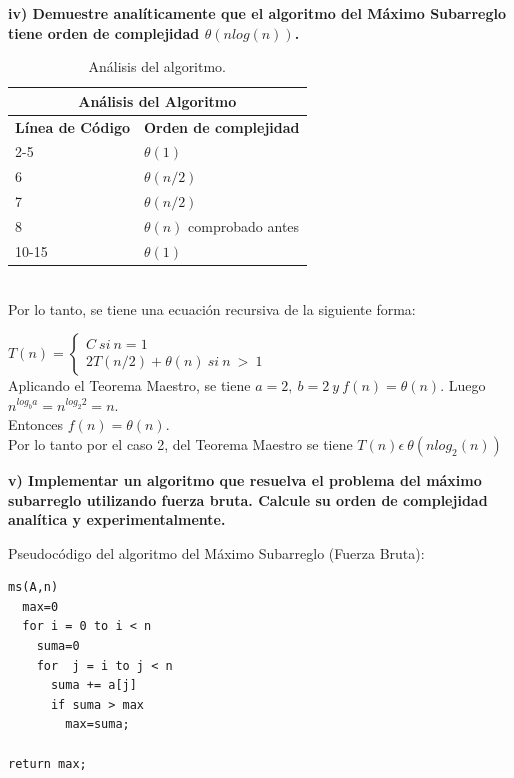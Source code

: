 \documentclass[12pt]{report}
\begin{document}
	\textbf{iv) Demuestre analíticamente que el algoritmo del Máximo Subarreglo tiene orden de complejidad $\theta (n log(n))$.}\newline
	\begin{table}[htbp]
		\begin{center}
			\begin{tabular}{|l|l|}
				\hline
				\multicolumn{2}{|c|}{Análisis del Algoritmo} \\ 
				\hline
				\textbf{Línea de Código} & \textbf{Orden de complejidad}\\
				\hline
				2-5 & $\theta (1)$ \\ \hline
				6 & $\theta (n/2)$ \\ \hline
				7 & $\theta (n/2)$ \\ \hline
				8 & $\theta (n)$ comprobado antes \\ \hline
				10-15 & $\theta (1)$ \\ \hline
			\end{tabular}
			\caption{Análisis del algoritmo.}
			\label{tabla:analisis3}
		\end{center}
	\end{table}\\
	Por lo tanto, se tiene una ecuación recursiva de la siguiente forma:
	
	$T(n) = \left \{ \begin{array}{c} C \ si \ n=1 \\ 2T(n/2)+\theta (n) \ si \ n \ > \ 1 \end{array}\right.$\\
	Aplicando el Teorema Maestro, se tiene $a=2, \ b=2 \ y \ f(n)=\theta (n)$. Luego $n^{log_{b}a}=n^{log_{2}2}=n$.\\
	Entonces $f(n)=\theta (n)$.\\
	Por lo tanto por el caso 2, del Teorema Maestro se tiene $T(n) \epsilon \ \theta (nlog_{2}(n))$
	\newpage
	
	\textbf{v) Implementar un algoritmo que resuelva el problema del máximo
		subarreglo utilizando fuerza bruta. Calcule su orden de complejidad analítica y experimentalmente.}\newline
	
Pseudocódigo del algoritmo del Máximo Subarreglo (Fuerza Bruta):
\lstset{language=C, breaklines=true, basicstyle=\footnotesize}
\lstset{numbers=left, numberstyle=\tiny, stepnumber=1, numbersep=10pt}
\begin{lstlisting}
ms(A,n)
  max=0			
  for i = 0 to i < n	
    suma=0	
    for  j = i to j < n
      suma += a[j]		
      if suma > max		
        max=suma;	

return max;
\end{lstlisting}
\end{document}
